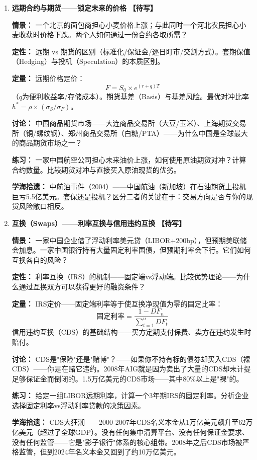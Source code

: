\documentclass[a4paper,11pt]{ctexart}
\newcommand{\draft}{\textcolor{orange!80!black}{\textbf{【待写】}}}
\begin{document}
\begin{enumerate}

\item[\textbf{第9课}] \textbf{远期合约与期货——锁定未来的价格} \draft

\textbf{情景：} 一个北京的面包商担心小麦价格上涨；与此同时一个河北农民担心小麦收获时价格下跌。两个人如何通过一份合约各取所需？

\textbf{定性：} 远期 vs 期货的区别（标准化/保证金/逐日盯市/交割方式）。套期保值（Hedging）与投机（Speculation）的本质区别。

\textbf{定量：} 远期价格定价：
\[
F = S_0 \times e^{(r+q)T}
\]
（$q$为便利收益率/存储成本）。期货基差（Basis）与基差风险。最优对冲比率 $h^* = \rho \times (\sigma_S / \sigma_F)$。

\textbf{讨论：} 中国商品期货市场——大连商品交易所（大豆/玉米）、上海期货交易所（铜/螺纹钢）、郑州商品交易所（白糖/PTA）——为什么中国是全球最大的商品期货市场之一？

\textbf{练习：} 一家中国航空公司担心未来油价上涨，如何使用原油期货对冲？计算合约数量。比较期货对冲与直接买入原油现货的优劣。

\textbf{学海拾遗：} 中航油事件（2004）——中国航油（新加坡）在石油期货上投机巨亏5.5亿美元。套保还是投机？区分二者的关键在于：交易方向是否与你的现货风险敞口相反。

\item[\textbf{第10课}] \textbf{互换（Swaps）——利率互换与信用违约互换} \draft

\textbf{情景：} 一家中国企业借了浮动利率美元贷（LIBOR+200bp），但预期美联储会加息。一家中国银行持有大量固定利率国债，但预期利率会下行。它们如何互换各自的风险？

\textbf{定性：} 利率互换（IRS）的机制——固定端vs浮动端。比较优势理论——为什么通过互换双方可以获得更好的融资条件？

\textbf{定量：} IRS定价——固定端利率等于使互换净现值为零的固定比率：
\[
\text{固定利率} = \frac{1 - DF_n}{\sum_{t=1}^{n} DF_t}
\]
信用违约互换（CDS）的基础结构——买方定期支付保费、卖方在违约发生时赔付。

\textbf{讨论：} CDS是"保险"还是"赌博"？——如果你不持有标的债券却买入CDS（裸CDS）——你是在赌它违约。2008年AIG就是因为卖出了大量的CDS却未计提足够保证金而倒闭的。1.5万亿美元的CDS市场——其中80\%以上是"裸"的。

\textbf{练习：} 给定一组LIBOR远期利率，计算一个3年期IRS的固定利率。分析企业选择固定利率vs浮动利率贷款的决策因素。

\textbf{学海拾遗：} CDS大狂潮——2000-2007年CDS名义本金从1万亿美元飙升至62万亿美元（超过了全球GDP）。没有任何集中清算平台、没有任何保证金要求、没有任何监管——它是"影子银行"体系的核心组带。2008年之后CDS市场被严格监管，但到2024年名义本金又回到了约10万亿美元。


\end{enumerate}
\end{document}
